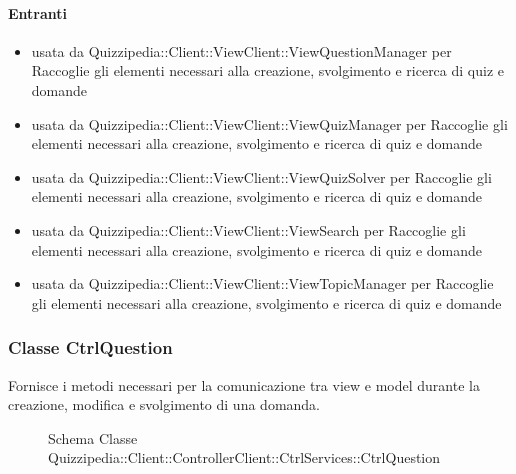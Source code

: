 \paragraph{Entranti}
\begin{itemize}
\item usata da Quizzipedia::Client::ViewClient::ViewQuestionManager per Raccoglie gli elementi necessari alla creazione, svolgimento e ricerca di quiz e domande
\item usata da Quizzipedia::Client::ViewClient::ViewQuizManager per Raccoglie gli elementi necessari alla creazione, svolgimento e ricerca di quiz e domande
\item usata da Quizzipedia::Client::ViewClient::ViewQuizSolver per Raccoglie gli elementi necessari alla creazione, svolgimento e ricerca di quiz e domande
\item usata da Quizzipedia::Client::ViewClient::ViewSearch per Raccoglie gli elementi necessari alla creazione, svolgimento e ricerca di quiz e domande
\item usata da Quizzipedia::Client::ViewClient::ViewTopicManager per Raccoglie gli elementi necessari alla creazione, svolgimento e ricerca di quiz e domande
\end{itemize}
\subsubsection{Classe CtrlQuestion}
Fornisce i metodi necessari per la comunicazione tra view e model durante la creazione, modifica e svolgimento di una domanda.
\begin{figure}[H]
\centering
\noindent{}
\caption[Schema Classe CtrlQuestion]{Schema Classe Quizzipedia::Client::ControllerClient::CtrlServices::CtrlQuestion}
\end{figure}
